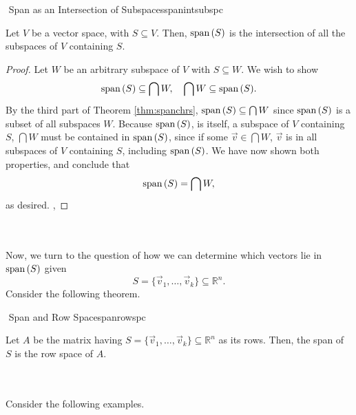         \begin{theorem}{\Stop\,\,Span as an Intersection of Subspaces}{spanintsubspc}
            
            Let \(V\) be a vector space, with \(S\subseteq V\). Then, \(\text{span\,}(S)\) is the intersection of all the subspaces of \(V\) containing \(S\).
            \begin{proof}
                Let \(W\) be an arbitrary subspace of \(V\) with \(S\subseteq W\). We wish to show
                \begin{equation*}
                    \text{span\,}(S)\subseteq\bigcap W,\quad \bigcap W\subseteq\text{span\,}(S).
                \end{equation*}
                By the third part of Theorem \ref{thm:spanchrs}, \(\text{span\,}(S)\subseteq \bigcap W\) since \(\text{span\,}(S)\) is a subset of all subspaces \(W\). Because \(\text{span\,}(S)\), is itself, a subspace of \(V\) containing \(S\), \(\bigcap W\) must be contained in \(\text{span\,}(S)\), since if some \(\vec{v}\in \bigcap W\), \(\vec{v}\) is in all subspaces of \(V\) containing \(S\), including \(\text{span\,}(S)\). We have now shown both properties, and conclude that
                \begin{equation*}
                    \text{span\,}(S)=\bigcap W,
                \end{equation*}
                as desired.
,            \end{proof}
        \end{theorem}
        \pagebreak
        \vphantom
        \\
        \\
        Now, we turn to the question of how we can determine which vectors lie in \(\text{span\,}(S)\) given
        \begin{equation*}
            S=\{\vec{v}_1,\ldots,\vec{v}_k\}\subseteq\mathbb{R}^n.
        \end{equation*}
        Consider the following theorem.
        \begin{theorem}{\Stop\,\,Span and Row Space}{spanrowspc}

            Let \(A\) be the matrix having \(S=\{\vec{v}_1,\ldots,\vec{v}_k\}\subseteq\mathbb{R}^n\) as its rows. Then, the span of \(S\) is the row space of \(A\).
            
        \end{theorem}
        \vphantom
        \\
        \\
        Consider the following examples.
